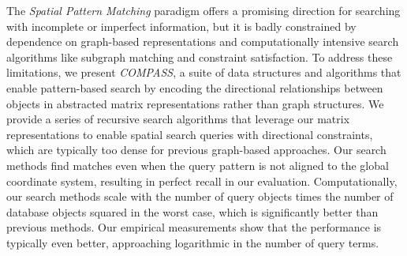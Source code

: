 

The \textit{Spatial Pattern Matching} paradigm offers a promising direction for searching with incomplete or imperfect information, but it is badly constrained by dependence on graph-based representations and computationally intensive search algorithms like subgraph matching and constraint satisfaction. 
To address these limitations, we present \emph{COMPASS}, a suite of data structures and algorithms that enable pattern-based search by encoding the directional relationships between objects in abstracted matrix representations rather than graph structures.
We provide a series of recursive search algorithms that leverage our matrix representations to enable spatial search queries with directional constraints, which are typically too dense for previous graph-based approaches.
Our search methods find matches even when the query pattern is not aligned to the global coordinate system, resulting in perfect recall in our evaluation. 
Computationally, our search methods scale with the number of query objects times the number of database objects squared in the worst case, which is significantly better than previous methods.
Our empirical measurements show that the performance is typically even better, approaching logarithmic in the number of query terms.



